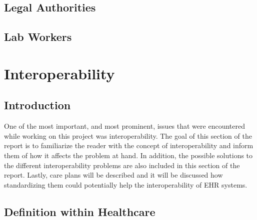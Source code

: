 \documentclass[14pt]{article}
\begin{document}
\subsection{Legal Authorities}
\subsection{Lab Workers}

\newpage

\section{Interoperability}
\label{sec:Interoperability}

\subsection{Introduction} 

One of the most important, and most prominent, issues that were encountered while working on this project was interoperability.  The goal of this section of the report is to familiarize the reader with the concept of interoperability and inform them of how it affects the problem at hand.  In addition, the possible solutions to the different interoperability problems are also included in this section of the report.  Lastly, care plans will be described and it will be discussed how standardizing them could potentially help the interoperability of \gls{EHR} systems.

\subsection{Definition within Healthcare} 


\end{document}
